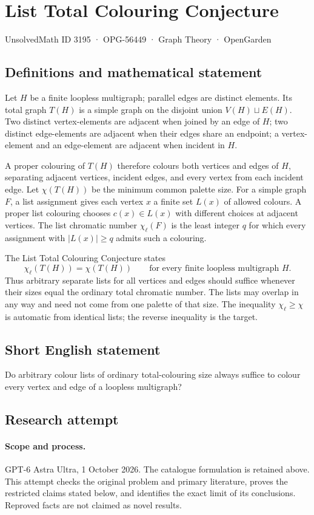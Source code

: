 \documentclass[11pt,a4paper]{article}
\begin{document}
\section*{List Total Colouring Conjecture}\label{3195}
{\small UnsolvedMath ID 3195 · OPG-56449 · Graph Theory · OpenGarden}
\subsection{Definitions and mathematical statement}
Let $H$ be a finite loopless multigraph; parallel
edges are distinct elements. Its total graph
$T(H)$ is a simple graph on the disjoint union
$V(H)\sqcup E(H)$. Two distinct vertex-elements
are adjacent when joined by an edge of $H$;
two distinct edge-elements are adjacent when
their edges share an endpoint; a vertex-element
and an edge-element are adjacent when incident
in $H$.

A proper colouring of $T(H)$ therefore colours
both vertices and edges of $H$, separating
adjacent vertices, incident edges, and every
vertex from each incident edge. Let
$\chi(T(H))$ be the minimum common palette size.
For a simple graph $F$, a list assignment gives
each vertex $x$ a finite set $L(x)$ of allowed
colours. A proper list colouring chooses
$c(x)\in L(x)$ with different choices at
adjacent vertices. The list chromatic number
$\chi_\ell(F)$ is the least integer $q$ for
which every assignment with $|L(x)|\geq q$
admits such a colouring.

The List Total Colouring Conjecture states
\[
 \chi_\ell(T(H))=\chi(T(H))
 \qquad\text{for every finite loopless multigraph }H.
\]
Thus arbitrary separate lists for all vertices
and edges should suffice whenever their sizes
equal the ordinary total chromatic number.
The lists may overlap in any way and need not
come from one palette of that size. The inequality
$\chi_\ell\geq\chi$ is automatic from identical
lists; the reverse inequality is the target.
\subsection{Short English statement}
Do arbitrary colour lists of ordinary total-colouring size always suffice to colour every vertex and edge of a loopless multigraph?
\subsection{Research attempt}
\paragraph{Scope and process.}
GPT-6 Astra Ultra, 1 October 2026. The catalogue formulation is retained above. This attempt checks the original problem and primary literature, proves the restricted claims stated below, and identifies the exact limit of its conclusions. Reproved facts are not claimed as novel results.
\end{document}
